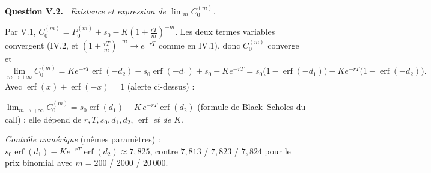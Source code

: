 \documentclass[11pt,a4paper]{article}
\newcommand{\question}[1]{\par\medskip\noindent\textbf{Question #1.}~}
\DeclareMathOperator{\erf}{erf}
\begin{document}
\begin{exo}
\question{V.2} \emph{Existence et expression de $\lim_mC^{(m)}_0$.}

Par V.1, $C^{(m)}_0=P^{(m)}_0+s_0-K(1+\frac{rT}m)^{-m}$. Les deux termes variables convergent (IV.2, et $(1+\frac{rT}m)^{-m}\to e^{-rT}$ comme en IV.1),
donc $C^{(m)}_0$ converge et
\[\lim_{m\to+\infty}C^{(m)}_0=Ke^{-rT}\erf(-d_2)-s_0\erf(-d_1)+s_0-Ke^{-rT}=s_0\bigl(1-\erf(-d_1)\bigr)-Ke^{-rT}\bigl(1-\erf(-d_2)\bigr).\]
Avec $\erf(x)+\erf(-x)=1$ (alerte ci-dessus) :
\begin{resultat}
$\displaystyle\lim_{m\to+\infty}C^{(m)}_0=s_0\erf(d_1)-K\,e^{-rT}\erf(d_2)$ (formule de Black--Scholes du call) ; elle dépend de $r,T,s_0,d_1,d_2$, $\erf$
\emph{et de $K$}.
\end{resultat}
\emph{Contrôle numérique} (mêmes paramètres) : $s_0\erf(d_1)-Ke^{-rT}\erf(d_2)\approx7{,}825$, contre $7{,}813$ / $7{,}823$ / $7{,}824$ pour le prix
binomial avec $m=200$ / $2000$ / $20\,000$.
\end{exo}
\end{document}
